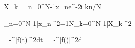 X_k=\sum_{n=0}^{N-1}x_ne^{-2\pi i kn/N}

\sum_{n=0}^{N-1}|x_n|^2=\frac1N\sum_{k=0}^{N-1}|X_k|^2

\int_{-\infty}^{\infty}|f(t)|^2dt=\int_{-\infty}^{\infty}|\hat f(\xi)|^2d\xi
